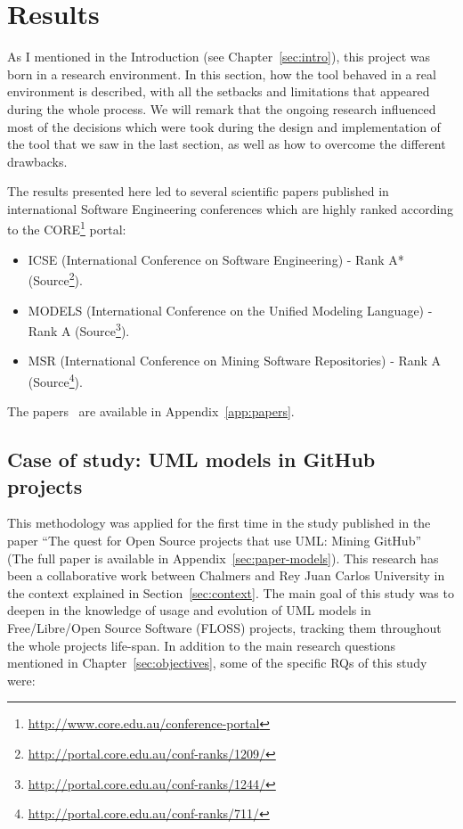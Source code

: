 \documentclass[a4paper, 12pt]{book}
\begin{document}
\chapter{Results}
\label{sec:results}

As I mentioned in the Introduction (see Chapter~\ref{sec:intro}), this project was born in a research environment.
In this section, how the tool behaved in a real environment is described, with all the setbacks
and limitations that appeared during the whole process. We will remark that the ongoing research
influenced most of the decisions which were took during the design and implementation
of the tool that we saw in the last section, as well as how to overcome the different drawbacks.

The results presented here led to several scientific papers published in international Software Engineering
conferences which are highly ranked according to the CORE\footnote{\url{http://www.core.edu.au/conference-portal}} portal:
\begin{itemize}
    \item ICSE (International Conference on Software Engineering) - Rank A* (Source\footnote{\url{http://portal.core.edu.au/conf-ranks/1209/}}).
    \item MODELS (International Conference on the Unified Modeling Language) - Rank A (Source\footnote{\url{http://portal.core.edu.au/conf-ranks/1244/}}).
    \item MSR (International Conference on Mining Software Repositories) - Rank A (Source\footnote{\url{http://portal.core.edu.au/conf-ranks/711/}}).
\end{itemize}

The papers~\cite{hebig2016quest,ho2017practices,robles2017extensive} are available in Appendix~\ref{app:papers}.


\section{Case of study: UML models in GitHub projects}
\label{sec:case-study-uml}

This methodology was applied for the first time in the study published in the paper ``The quest for Open Source projects that use
UML: Mining GitHub''~\cite{hebig2016quest} (The full paper is available in Appendix~\ref{sec:paper-models}).
This research has been a collaborative work between Chalmers and Rey Juan Carlos University in the context
explained in Section~\ref{sec:context}.
The main goal of this study was to deepen in the knowledge of usage and evolution of UML models in
Free/Libre/Open Source Software (FLOSS) projects, tracking them throughout the whole projects life-span.
In addition to the main research questions mentioned in Chapter~\ref{sec:objectives}, some of the specific RQs
of this study were:
\end{document}
